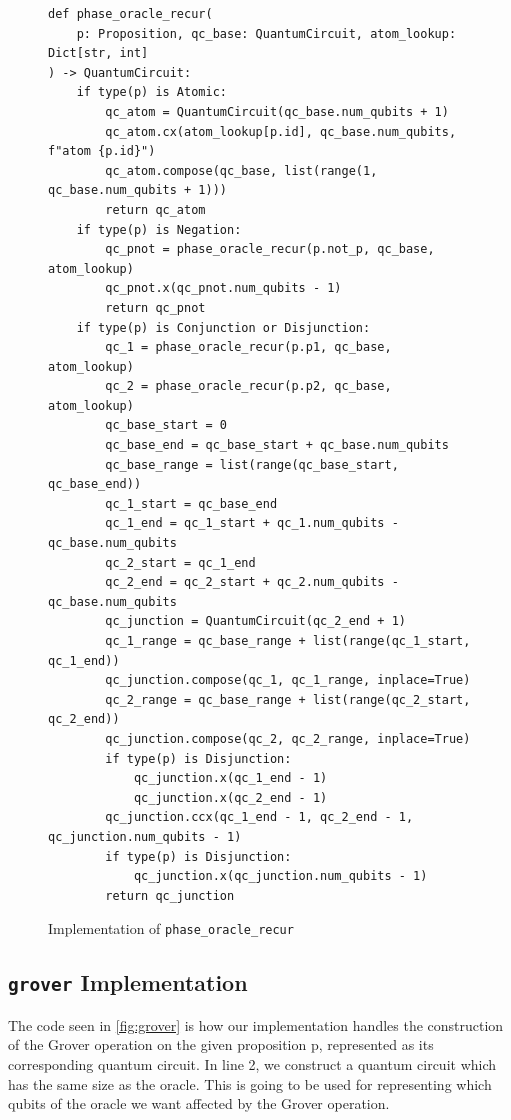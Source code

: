 \begin{figure}[H]
\centering
\begin{verbatim}
def phase_oracle_recur(
    p: Proposition, qc_base: QuantumCircuit, atom_lookup: Dict[str, int]
) -> QuantumCircuit:
    if type(p) is Atomic:
        qc_atom = QuantumCircuit(qc_base.num_qubits + 1)
        qc_atom.cx(atom_lookup[p.id], qc_base.num_qubits, f"atom {p.id}")
        qc_atom.compose(qc_base, list(range(1, qc_base.num_qubits + 1)))
        return qc_atom
    if type(p) is Negation:
        qc_pnot = phase_oracle_recur(p.not_p, qc_base, atom_lookup)
        qc_pnot.x(qc_pnot.num_qubits - 1)
        return qc_pnot
    if type(p) is Conjunction or Disjunction:
        qc_1 = phase_oracle_recur(p.p1, qc_base, atom_lookup)
        qc_2 = phase_oracle_recur(p.p2, qc_base, atom_lookup)
        qc_base_start = 0
        qc_base_end = qc_base_start + qc_base.num_qubits
        qc_base_range = list(range(qc_base_start, qc_base_end))
        qc_1_start = qc_base_end
        qc_1_end = qc_1_start + qc_1.num_qubits - qc_base.num_qubits
        qc_2_start = qc_1_end
        qc_2_end = qc_2_start + qc_2.num_qubits - qc_base.num_qubits
        qc_junction = QuantumCircuit(qc_2_end + 1)
        qc_1_range = qc_base_range + list(range(qc_1_start, qc_1_end))
        qc_junction.compose(qc_1, qc_1_range, inplace=True)
        qc_2_range = qc_base_range + list(range(qc_2_start, qc_2_end))
        qc_junction.compose(qc_2, qc_2_range, inplace=True)
        if type(p) is Disjunction:
            qc_junction.x(qc_1_end - 1)
            qc_junction.x(qc_2_end - 1)
        qc_junction.ccx(qc_1_end - 1, qc_2_end - 1, qc_junction.num_qubits - 1)
        if type(p) is Disjunction:
            qc_junction.x(qc_junction.num_qubits - 1)
        return qc_junction
\end{verbatim}
\caption{Implementation of \texttt{phase\_oracle\_recur} }
\label{fig:phase_oracle_recur}
\end{figure}

\subsection{\texttt{grover} Implementation}\label{subsec:grover-implementation}

The code seen in \autoref{fig:grover} is how our implementation handles the construction of the Grover operation on the given proposition p, represented as its corresponding quantum circuit.
In line 2, we construct a quantum circuit which has the same size as the oracle.
This is going to be used for representing which qubits of the oracle we want affected by the Grover operation.

